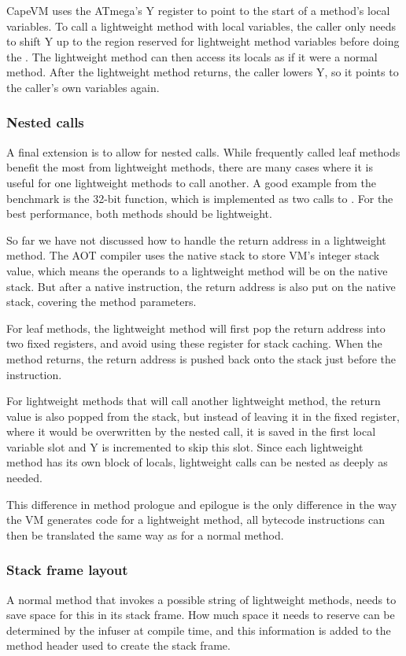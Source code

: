 CapeVM uses the ATmega's Y register to point to the start of a method's local variables. To call a lightweight method with local variables, the caller only needs to shift Y up to the region reserved for lightweight method variables before doing the . The lightweight method can then access its locals as if it were a normal method. After the lightweight method returns, the caller lowers Y, so it points to the caller's own variables again.

\subsubsection{Nested calls}
A final extension is to allow for nested calls. While frequently called leaf methods benefit the most from lightweight methods, there are many cases where it is useful for one lightweight methods to call another. A good example from the  benchmark is the 32-bit  function, which is implemented as two calls to . For the best performance, both methods should be lightweight.

So far we have not discussed how to handle the return address in a lightweight method. The AOT compiler uses the native stack to store VM's integer stack value, which means the operands to a lightweight method will be on the native stack. But after a native  instruction, the return address is also put on the native stack, covering the method parameters.

For leaf methods, the lightweight method will first pop the return address into two fixed registers, and avoid using these register for stack caching. When the method returns, the return address is pushed back onto the stack just before the  instruction.

For lightweight methods that will call another lightweight method, the return value is also popped from the stack, but instead of leaving it in the fixed register, where it would be overwritten by the nested call, it is saved in the first local variable slot and Y is incremented to skip this slot. Since each lightweight method has its own block of locals, lightweight calls can be nested as deeply as needed.

This difference in method prologue and epilogue is the only difference in the way the VM generates code for a lightweight method, all bytecode instructions can then be translated the same way as for a normal method.

\subsubsection{Stack frame layout}
A normal method that invokes a possible string of lightweight methods, needs to save space for this in its stack frame. How much space it needs to reserve can be determined by the infuser at compile time, and this information is added to the method header used to create the stack frame.

